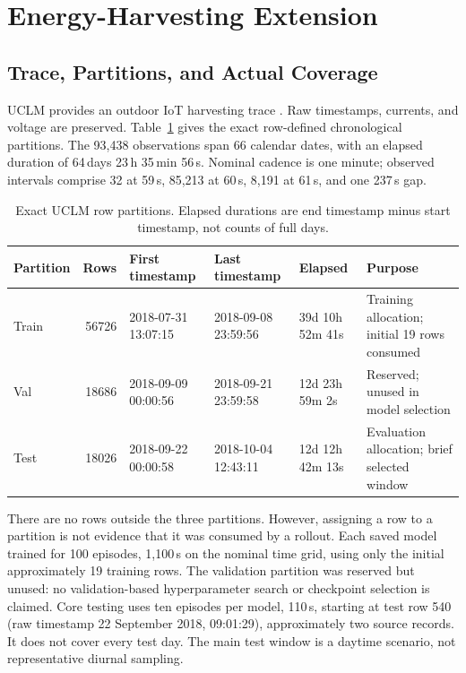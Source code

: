 \documentclass[conference]{IEEEtran}
\begin{document}
\section{Energy-Harvesting Extension}
\label{sec:ehmethod}
\subsection{Trace, Partitions, and Actual Coverage}
UCLM provides an outdoor IoT harvesting trace \cite{UCLM,UCLMData}. Raw timestamps, currents, and voltage are preserved. Table~\ref{tab:split} gives the exact row-defined chronological partitions. The 93,438 observations span 66 calendar dates, with an elapsed duration of 64\,days 23\,h 35\,min 56\,s. Nominal cadence is one minute; observed intervals comprise 32 at 59\,s, 85,213 at 60\,s, 8,191 at 61\,s, and one 237\,s gap.
\begin{table}[t]
\centering\footnotesize
\caption{Exact UCLM row partitions. Elapsed durations are end timestamp minus start timestamp, not counts of full days.}
\label{tab:split}
\begin{tabular}{@{}lrllll@{}}\toprule
Partition & Rows & First timestamp & Last timestamp & Elapsed & Purpose\\\midrule
Train & 56726 & 2018-07-31 13:07:15 & 2018-09-08 23:59:56 & 39d 10h 52m 41s & Training allocation; initial 19 rows consumed \\
Val & 18686 & 2018-09-09 00:00:56 & 2018-09-21 23:59:58 & 12d 23h 59m 2s & Reserved; unused in model selection \\
Test & 18026 & 2018-09-22 00:00:58 & 2018-10-04 12:43:11 & 12d 12h 42m 13s & Evaluation allocation; brief selected window \\
\bottomrule\end{tabular}
\end{table}

There are no rows outside the three partitions. However, assigning a row to a partition is not evidence that it was consumed by a rollout. Each saved model trained for 100 episodes, 1,100\,s on the nominal time grid, using only the initial approximately 19 training rows. The validation partition was reserved but unused: no validation-based hyperparameter search or checkpoint selection is claimed. Core testing uses ten episodes per model, 110\,s, starting at test row 540 (raw timestamp 22 September 2018, 09:01:29), approximately two source records. It does not cover every test day. The main test window is a daytime scenario, not representative diurnal sampling.
\end{document}
